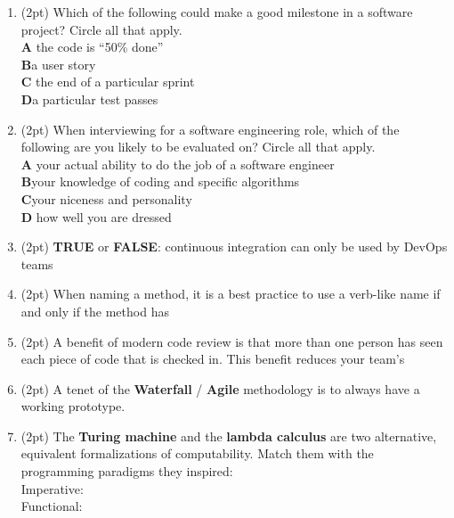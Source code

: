 \documentclass{report}
\newif\ifkey
\newcommand{\correct}[1]{\ifkey\color{red}\textbf{#1}\color{black}\else\textbf{#1}\fi\xspace}
\newcommand{\answershort}[1]{\ifkey\color{red}\underline{\textbf{#1}}\color{black}\else\underline{\hspace{3in}}\fi\xspace}
\newcommand*{\pts}[1]{\addtocounter{points}{#1}(#1pt)}
\begin{document}
\begin{spacing}{1.4}
\begin{enumerate}[leftmargin=*]
\item \pts{2}
  Which of the following could make a good milestone in a software project? Circle all that apply.
  \\ \textbf{A}\hspace{0.2in} the code is ``50\% done''
  \\ \correct{B}\hspace{0.2in}a user story
  \\ \textbf{C}\hspace{0.2in} the end of a particular sprint
  \\ \correct{D}\hspace{0.2in}a particular test passes

\item \pts{2}
  When interviewing for a software engineering role, which of the following are you likely to be evaluated on? Circle all that apply.
  \\ \textbf{A}\hspace{0.2in} your actual ability to do the job of a software engineer
  \\ \correct{B}\hspace{0.2in}your knowledge of coding and specific algorithms
  \\ \correct{C}\hspace{0.2in}your niceness and personality
  \\ \textbf{D}\hspace{0.2in} how well you are dressed
  
\item \pts{2}
  \textbf{TRUE} or \correct{FALSE}: continuous integration can only be used by DevOps teams

\item \pts{2}
  When naming a method, it is a best practice to use a verb-like name if and only if the method has \answershort{side-effects}

\item \pts{2}
  A benefit of modern code review is that more than one person has seen each piece of code that is checked in. This benefit
  reduces your team's \answershort{bus factor}

\item \pts{2}
  A tenet of the \textbf{Waterfall} / \correct{Agile} methodology is to always have a working prototype.

\item \pts{2}
  The \textbf{Turing machine} and the \textbf{lambda calculus} are two alternative, equivalent formalizations of computability.
  Match them with the programming paradigms they inspired: \\
  Imperative: \answershort{Turing machine} \\
  Functional: \answershort{lambda calculus}


\end{enumerate}
\end{spacing}
\end{document}
